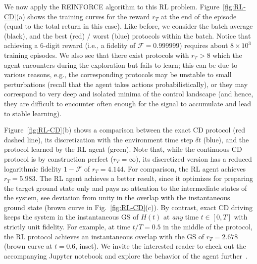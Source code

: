 We now apply the REINFORCE algorithm to this RL problem.
Figure~\ref{fig:RL-CD}(a) shows the training curves for the reward $r_T$ at the end of the episode (equal to the total return in this case). Like before, we consider the batch average (black), and the best (red) / worst (blue) protocols within the batch. Notice that achieving a 6-digit reward (i.e., a fidelity of $\mathcal F=0.999999$) requires about $8\times 10^3$ training episodes. We also see that there exist protocols with $r_T>8$ which the agent encounters during the exploration but fails to learn; this can be due to various reasons, e.g., the corresponding protocols may be unstable to small perturbations (recall that the agent takes actions probabilistically), or they may correspond to very deep and isolated minima of the control landscape (and hence, they are difficult to encounter often enough for the signal to accumulate and lead to stable learning).   

Figure~\ref{fig:RL-CD}(b) shows a comparison between the exact CD protocol (red dashed line), its discretization with the environment time step $\delta t$ (blue), and the protocol learned by the RL agent (green). Note that, while the continuous CD protocol is by construction perfect ($r_T=\infty)$, its discretized version has a reduced logarithmic fidelity $1-\mathcal{F}$ of $r_T=4.144$. For comparison, the RL agent achieves $r_T=5.983$. The RL agent achieves a better result, since it optimizes for preparing the target ground state only and pays no attention to the intermediate states of the system, see deviation from unity in the overlap with the instantaneous ground state (brown curve in Fig.~\ref{fig:RL-CD}(c)). By contrast, exact CD driving keeps the system in the instantaneous GS of $H(t)$ at \textit{any} time $t\in[0,T]$ with strictly unit fidelity. For example, at time $t/T=0.5$ in the middle of the protocol, the RL protocol achieves an instantaneous overlap with the GS of $r_T=2.678$ (brown curve at $t=0.6$, inset).
We invite the interested reader to check out the accompanying Jupyter notebook and explore the behavior of the agent further~\cite{github_code}.



